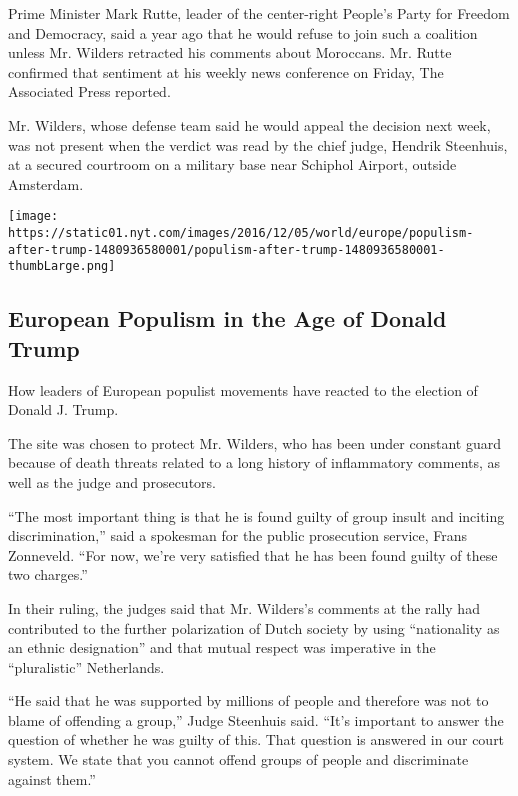 Prime Minister Mark Rutte, leader of the center-right People's Party for
Freedom and Democracy, said a year ago that he would refuse to join such
a coalition unless Mr. Wilders retracted his comments about Moroccans.
Mr. Rutte confirmed that sentiment at his weekly news conference on
Friday, The Associated Press reported.

Mr. Wilders, whose defense team said he would appeal the decision next
week, was not present when the verdict was read by the chief judge,
Hendrik Steenhuis, at a secured courtroom on a military base near
Schiphol Airport, outside Amsterdam.

\href{https://www.nytimes.com/interactive/2016/12/05/world/europe/populism-in-age-of-trump.html}{}

\texttt{[image: https://static01.nyt.com/images/2016/12/05/world/europe/populism-after-trump-1480936580001/populism-after-trump-1480936580001-thumbLarge.png]}

\hypertarget{european-populism-in-the-age-of-donald-trump}{%
\subsection{European Populism in the Age of Donald
Trump}\label{european-populism-in-the-age-of-donald-trump}}

How leaders of European populist movements have reacted to the election
of Donald J. Trump.

The site was chosen to protect Mr. Wilders, who has been under constant
guard because of death threats related to a long history of inflammatory
comments, as well as the judge and prosecutors.

``The most important thing is that he is found guilty of group insult
and inciting discrimination,'' said a spokesman for the public
prosecution service, Frans Zonneveld. ``For now, we're very satisfied
that he has been found guilty of these two charges.''

In their ruling, the judges said that Mr. Wilders's comments at the
rally had contributed to the further polarization of Dutch society by
using ``nationality as an ethnic designation'' and that mutual respect
was imperative in the ``pluralistic'' Netherlands.

``He said that he was supported by millions of people and therefore was
not to blame of offending a group,'' Judge Steenhuis said. ``It's
important to answer the question of whether he was guilty of this. That
question is answered in our court system. We state that you cannot
offend groups of people and discriminate against them.''

